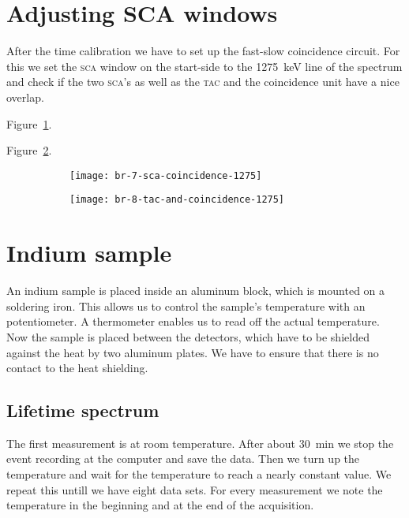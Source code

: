 \documentclass[11pt, english, fleqn, DIV=15, headinclude, BCOR=2cm]{scrreprt}
\begin{document}
\section{Adjusting SCA windows}

After the time calibration we have to set up the fast-slow coincidence
circuit. For this we set the \textsc{sca} window on the start-side
to the \SI{1275}{\kilo\electronvolt} line of the spectrum and check if the
two \textsc{sca}'s as well as the \textsc{tac} and the coincidence unit have
a nice overlap.

Figure~\ref{fig:7-sca-coincidence-1275}.

Figure~\ref{fig:8-tac-and-coincidence-1275}.

\begin{figure}
    \centering
    \begin{subfigure}[c]{0.48\linewidth}
        \centering
        \texttt{[image: br-7-sca-coincidence-1275]}
        \caption{%
        }
        \label{fig:7-sca-coincidence-1275}
    \end{subfigure}
    \hfill
    \begin{subfigure}[c]{0.48\linewidth}
        \centering
        \texttt{[image: br-8-tac-and-coincidence-1275]}
        \caption{%
        }
        \label{fig:8-tac-and-coincidence-1275}
    \end{subfigure}
    \caption{%
    }
    \label{fig:}
\end{figure}

\section{Indium sample}

An indium sample is placed inside an aluminum block, which is mounted on a
soldering iron. This allows us to control the sample's temperature with an
potentiometer. A thermometer enables us to read off the actual temperature. Now
the sample is placed between the detectors, which have to be shielded against
the heat by two aluminum plates. We have to ensure that there is no contact to
the heat shielding. 

\subsection{Lifetime spectrum}

The first measurement is at room temperature. After about \SI{30}{\minute} we
stop the event recording at the computer and save the data. Then we turn up the
temperature and wait for the temperature to reach a nearly
constant value. We repeat this untill we have eight data sets. For every
measurement we note the temperature in the beginning and at the end of the
acquisition.
\end{document}
